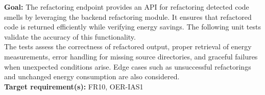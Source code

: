\documentclass[12pt, titlepage]{article}
\begin{document}
  \textbf{Goal:} The refactoring endpoint provides an API for
  refactoring detected code smells by leveraging the backend
  refactoring module. It ensures that refactored code is returned
  efficiently while verifying energy savings. The following unit
  tests validate the accuracy of this functionality.\\

  \noindent The tests assess the correctness of refactored output,
  proper retrieval of energy measurements, error handling for missing
  source directories, and graceful failures when unexpected
  conditions arise. Edge cases such as unsuccessful refactorings and
  unchanged energy consumption are also considered.\\

  \noindent\textbf{Target requirement(s):} FR10, OER-IAS1~\cite{SRS} \\
\end{document}
